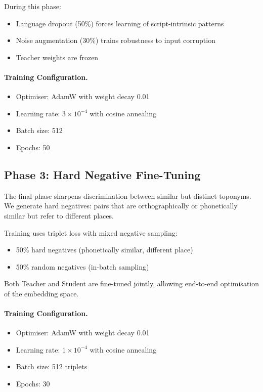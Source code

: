 \documentclass[11pt,a4paper]{article}
\begin{document}
During this phase:
\begin{itemize}
    \item Language dropout (50\%) forces learning of script-intrinsic patterns
    \item Noise augmentation (30\%) trains robustness to input corruption
    \item Teacher weights are frozen
\end{itemize}

\paragraph{Training Configuration.}
\begin{itemize}
    \item Optimiser: AdamW with weight decay 0.01
    \item Learning rate: $3 \times 10^{-4}$ with cosine annealing
    \item Batch size: 512
    \item Epochs: 50
\end{itemize}

\subsection{Phase 3: Hard Negative Fine-Tuning}

The final phase sharpens discrimination between similar but distinct toponyms. We generate hard negatives: pairs that are orthographically or phonetically similar but refer to different places.

Training uses triplet loss with mixed negative sampling:
\begin{itemize}
    \item 50\% hard negatives (phonetically similar, different place)
    \item 50\% random negatives (in-batch sampling)
\end{itemize}

Both Teacher and Student are fine-tuned jointly, allowing end-to-end optimisation of the embedding space.

\paragraph{Training Configuration.}
\begin{itemize}
    \item Optimiser: AdamW with weight decay 0.01
    \item Learning rate: $1 \times 10^{-4}$ with cosine annealing
    \item Batch size: 512 triplets
    \item Epochs: 30
\end{itemize}
\end{document}
